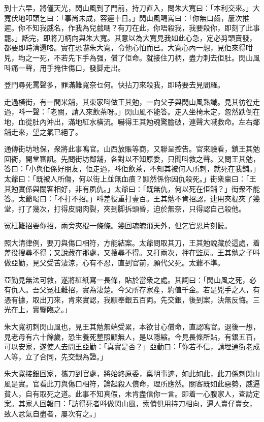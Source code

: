 \documentclass[a5paper, 12pt, openany]{book} %
\begin{document}
	到十六早，將僅天光，閃山風到了門前，持刀直入，問朱大寬曰：「本利交來。」大寬伏地叩頭乞曰：「事尚未成，容遲十日。」閃山風喝罵曰：「你無口齒，屢次推遲。你不知我威名，作我為兒戲嗎？有刀在此，你唔殺我，我要殺你，即刻了此事罷。」話完，即將刀柄向與朱大寬。其意以為大寬見我如此心急，定必剪頭賣發，都要即時清還咯。實在恐嚇朱大寬，令他心怕而已。大寬心內一想，見佢來得咁兇，均之一死，不若先下手為强，償了佢命。就接住刀柄，盡力刺去佢肚。閃山風呌痛一聲，用手掩住傷口，發脚走出。

	登門尋死罵聲多，罪滿難寬奈乜何。快拈刀來殺我，即時要去見閻羅。

	走過橫街，有一間米舖，其東家呌做王其勉，一向父子與閃山風熟識。見其彷徨走過，呌一聲：「老關，請入來飲茶呀。」閃山風不能答。走入坐椅未定，忽然跌倒在地，血從肚內沖出，滿地紅水橫流。嚇得王其勉魂驚膽破，連聲大喊救命。左右鄰舖走來，望之氣已絕了。

	通傳街坊地保，衆將此事鳴官。山西放賬等商，又聯呈控告。官來驗看，鎖王其勉回衙，開堂審訊。先問街坊鄰舖，各對以不知原委，只聞呌救之聲。又問王其勉，答曰：「小與佢係好朋友，佢走過，呌佢飲茶，不知其被何人所刺，就死在我舖。」太爺曰：「既被人所傷，何以街上並無血痕？顯然係你因仇殺死。」街衆稟曰：「王其勉實係與關客相好，非有夙仇。」太爺曰：「既無仇，何以死在佢舖？」街衆不能答。太爺喝曰：「不打不招。」呌差役重打壹百。王其勉不肯招認，連用夾棍夾了幾堂，打了幾次，打得皮開肉裂，夾到脚拆頭昏，迫於無奈，只得認自己殺他。

	冤枉難招要你招，兩旁夾棍一條條。幾回魂魄飛天外，但乞官恩片刻饒。

	照大清律例，要刀與傷口相符，方能結案。太爺問取其刀，王其勉說藏於這處，着差役搜尋不得；又說藏在那處，又搜尋不得。又打兩次，押在監房。王其勉之子呌做亞勤，見父受苦淒涼，心有不忍，直到官前，願代父死。太爺不準。

	亞勤見無法可救，遂將紅紙寫一長條，貼於當衆之處。其詞曰：「閃山風之死，必有仇人。吾父冤枉難招，實為淒楚。今父所存家產，約值千金。若是兇手之人，有憑有據，取出刀來，肯來實認，我願奉銀五百両。先交銀，後到案，決無反悔。三光在上，實鑒臨之。」

	朱大寬初刺閃山風也，見王其勉無端受累，本欲甘心償命，直認鳴官。退後一想，見老母有六十餘歲，恐生養死塟照顧無人，是以隱縮。今見長條所貼，有銀五百，可以安家，遂使人去問王亞勤：「真實是否？」亞勤曰：「你若不信，請埋通街老成人等，立了合同，先交銀為證。」

	朱大寬接銀回家，攜刀到官處，將始終原委，稟明事迹，如此如此，此刀係刺閃山風是實。官看此刀與傷口相符，論起殺人償命，理所應然。關客既如此惡勢，威逼貧人，自有取死之道。此事不知真假，未肯盡信你一言。即着一心腹家人，查訪定案。其家人回報曰：「訪得死者呌做閃山風，索債俱用持刀相向，逼人賣仔賣女，致人忿氣自盡者，屢次有之。」
\end{document}
